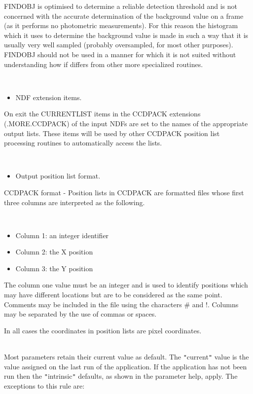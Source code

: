 \documentclass[twoside,11pt]{article}
\renewcommand{\_}{\texttt{\symbol{95}}}
\newcommand{\qt}[1]{{\tt "}#1{\tt "}}
\newcommand{\routine}[1]{{\sc #1}}
\newcommand{\sstdiytopic}[2]{\item[#1:] \mbox{} \\[1.3ex] #2}
\newcommand{\sstitemlist}[1]{
  \mbox{} \\
  \vspace{-3.5ex}
  \begin{itemize}
     #1
  \end{itemize}
}
\newcommand{\sstitem}{\item}
\newcommand{\sstdiytopic}[2]{\item[{#1:}] #2 }
\newcommand{\sstitemlist}[1]{
      \begin{itemize}
         #1
      \end{itemize}
      \\
   }
\newcommand{\sstitem}{\item}
\begin{document}
{{        \routine{FINDOBJ} is optimised to determine a reliable detection threshold
        and is not concerned with the accurate determination of the
        background value on a frame (as it performs no photometric
        measurements). For this reason the histogram which it uses to
        determine the background value is made in such a way that it is
        usually very well sampled (probably oversampled, for most other
        purposes). \routine{FINDOBJ} should not be used in a manner for which it
        is not suited without understanding how if differs from other
        more specialized routines.

      \sstitemlist{

         \sstitem
         NDF extension items.

      }
        On exit the CURRENT\_LIST items in the CCDPACK extensions
        (.MORE.CCDPACK) of the input NDFs are set to the names of the
        appropriate output lists. These items will be used by other
        CCDPACK position list processing routines to automatically
        access the lists.

      \sstitemlist{

         \sstitem
         Output position list format.

      }
        CCDPACK format - Position lists in CCDPACK are formatted files
        whose first three columns are interpreted as the following.

      \sstitemlist{

         \sstitem
              Column 1: an integer identifier

         \sstitem
              Column 2: the X position

         \sstitem
              Column 3: the Y position

      }
        The column one value must be an integer and is used to identify
        positions which may have different locations but are to be
        considered as the same point. Comments may be included in the
        file using the characters \# and !. Columns may be separated by
        the use of commas or spaces.

        In all cases the coordinates in position lists are pixel 
        coordinates.
   }
   \sstdiytopic{
      Behaviour of parameters
   } {
      Most parameters retain their current value as default. The
      \qt{current} value is the value assigned on the last run of the
      application. If the application has not been run then the
      \qt{intrinsic} defaults, as shown in the parameter help, apply.
      The exceptions to this rule are:
      \sstitemlist{

}}}
\end{document}
